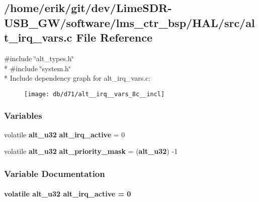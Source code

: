 \subsection{/home/erik/git/dev/\+Lime\+S\+D\+R-\/\+U\+S\+B\+\_\+\+G\+W/software/lms\+\_\+ctr\+\_\+bsp/\+H\+A\+L/src/alt\+\_\+irq\+\_\+vars.c File Reference}
\label{alt__irq__vars_8c}
{\ttfamily \#include \char`\"{}alt\+\_\+types.\+h\char`\"{}}\\*
{\ttfamily \#include \char`\"{}system.\+h\char`\"{}}\\*
Include dependency graph for alt\+\_\+irq\+\_\+vars.\+c\+:
\nopagebreak
\begin{figure}[H]
\begin{center}
\leavevmode
\texttt{[image: db/d71/alt\_\_irq\_\_vars\_8c\_\_incl]}
\end{center}
\end{figure}
\subsubsection*{Variables}
\begin{DoxyCompactItemize}
\item 
volatile {\bf alt\+\_\+u32} {\bf alt\+\_\+irq\+\_\+active} = 0
\item 
volatile {\bf alt\+\_\+u32} {\bf alt\+\_\+priority\+\_\+mask} = ({\bf alt\+\_\+u32}) -\/1
\end{DoxyCompactItemize}


\subsubsection{Variable Documentation}
\paragraph[{alt\+\_\+irq\+\_\+active}]{\setlength{\rightskip}{0pt plus 5cm}volatile {\bf alt\+\_\+u32} alt\+\_\+irq\+\_\+active = 0}\label{alt__irq__vars_8c_ad449fadae38214d7d07462b55f53dfd1}


